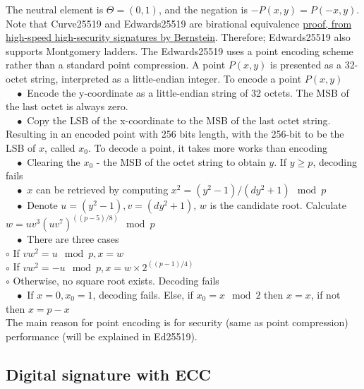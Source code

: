 The neutral element is $\Theta = (0,1)$, and the negation is $-P(x, y) = P(-x, y)$. Note that Curve25519 and Edwards25519 are birational equivalence \href{https://www.researchgate.net/publication/225544274_High-Speed_High-Security_Signatures}{proof, from high-speed high-security signatures by Bernstein}. Therefore; Edwards25519 also supports Montgomery ladders. The Edwards25519 uses a point encoding scheme rather than a standard point compression. A point $P(x, y)$ is presented as a 32-octet string, interpreted as a little-endian integer. To encode a point $P(x, y)$\\
$\quad\bullet$ Encode the y-coordinate as a little-endian string of 32 octets. The MSB of the last octet is always zero.\\
$\quad\bullet$ Copy the LSB of the x-coordinate to the MSB of the last octet string.\\
Resulting in an encoded point with 256 bits length, with the 256-bit to be the LSB of $x$, called $x_0$. To decode a point, it takes more works than encoding\\
$\quad\bullet$ Clearing the $x_0$ - the MSB of the octet string to obtain $y$. If $y \geq p$, decoding fails\\
$\quad\bullet$ $x$ can be retrieved by computing $x^2 = (y^2 - 1)/(dy^2 + 1) \mod p$\\
$\quad\bullet$ Denote $u = (y^2-1), v = (dy^2 + 1)$, $w$ is the candidate root. Calculate $w = uv^3(uv^7)^((p-5)/8) \mod p$\\
$\quad\bullet$ There are three cases\\
\vspace{0.5cm} $\circ$ If $vw^2 = u \mod p, x = w$ \\
\vspace{0.5cm} $\circ$ If $vw^2 = -u \mod p, x = w \times 2^((p-1)/4)$\\
\vspace{0.5cm} $\circ$ Otherwise, no square root exists. Decoding fails\\
$\quad\bullet$ If $x = 0,x_0 = 1$, decoding fails. Else, if $x_0 = x \mod 2$ then $x = x$, if not then $x = p - x$\\

The main reason for point encoding is for security (same as point compression) performance (will be explained in Ed25519).
\subsection{Digital signature with ECC}

